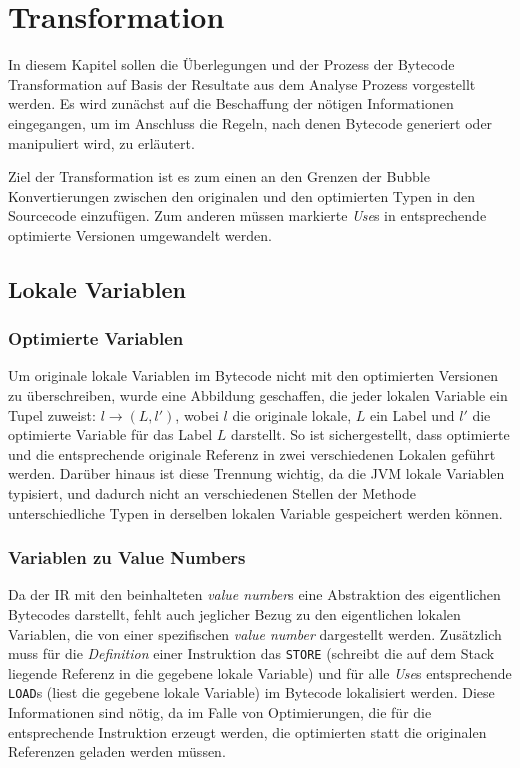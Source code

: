 \chapter{Transformation}
\label{ch:trans}

In diesem Kapitel sollen die Überlegungen und der Prozess der Bytecode Transformation
auf Basis der Resultate aus dem Analyse Prozess vorgestellt werden. Es wird zunächst 
auf die Beschaffung der nötigen Informationen eingegangen, um im Anschluss die Regeln,
nach denen Bytecode generiert oder manipuliert wird, zu erläutert.

Ziel der Transformation ist es zum einen an den Grenzen der Bubble Konvertierungen zwischen den
originalen und den optimierten Typen in den Sourcecode einzufügen. Zum anderen müssen
markierte \textit{Use}s in entsprechende optimierte Versionen umgewandelt werden. 

\section{Lokale Variablen}
\label{sec:locals}

\subsection{Optimierte Variablen}

Um originale lokale Variablen im Bytecode nicht mit den optimierten Versionen zu 
überschreiben, wurde eine Abbildung geschaffen, die jeder lokalen Variable ein Tupel 
zuweist: $l \rightarrow (L,l')$, wobei $l$ die originale lokale, $L$ ein Label und 
$l'$ die optimierte Variable für das Label $L$ darstellt. So ist sichergestellt, dass
optimierte und die entsprechende originale Referenz in zwei verschiedenen Lokalen 
geführt werden. Darüber hinaus ist diese Trennung wichtig, da die JVM 
lokale Variablen typisiert, und dadurch nicht an verschiedenen Stellen der Methode 
unterschiedliche Typen in derselben lokalen Variable gespeichert werden können.

\subsection{Variablen zu Value Numbers}

Da der IR mit den beinhalteten \textit{value number}s eine Abstraktion des eigentlichen Bytecodes
darstellt, fehlt auch jeglicher Bezug zu den eigentlichen lokalen Variablen, die von
einer spezifischen \textit{value number} dargestellt werden. Zusätzlich muss für die \textit{Definition}
einer Instruktion das \texttt{STORE} (schreibt die auf dem Stack liegende Referenz in 
die gegebene lokale Variable) und für alle \textit{Use}s entsprechende \texttt{LOAD}s (liest die 
gegebene lokale Variable) im Bytecode lokalisiert werden. Diese Informationen sind nötig,
da im Falle von Optimierungen, die für die entsprechende Instruktion erzeugt werden, 
die optimierten statt die originalen Referenzen geladen werden müssen.

